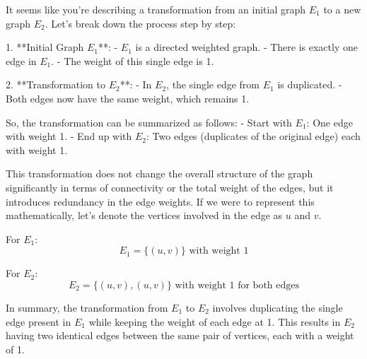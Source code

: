 It seems like you're describing a transformation from an initial graph \( E_1 \) to a new graph \( E_2 \). Let's break down the process step by step:

1. **Initial Graph \( E_1 \)**:
   - \( E_1 \) is a directed weighted graph.
   - There is exactly one edge in \( E_1 \).
   - The weight of this single edge is 1.

2. **Transformation to \( E_2 \)**:
   - In \( E_2 \), the single edge from \( E_1 \) is duplicated.
   - Both edges now have the same weight, which remains 1.

So, the transformation can be summarized as follows:
- Start with \( E_1 \): One edge with weight 1.
- End up with \( E_2 \): Two edges (duplicates of the original edge) each with weight 1.

This transformation does not change the overall structure of the graph significantly in terms of connectivity or the total weight of the edges, but it introduces redundancy in the edge weights. If we were to represent this mathematically, let's denote the vertices involved in the edge as \( u \) and \( v \).

For \( E_1 \):
\[ E_1 = \{(u, v)\} \text{ with weight } 1 \]

For \( E_2 \):
\[ E_2 = \{(u, v), (u, v)\} \text{ with weight } 1 \text{ for both edges} \]

In summary, the transformation from \( E_1 \) to \( E_2 \) involves duplicating the single edge present in \( E_1 \) while keeping the weight of each edge at 1. This results in \( E_2 \) having two identical edges between the same pair of vertices, each with a weight of 1.